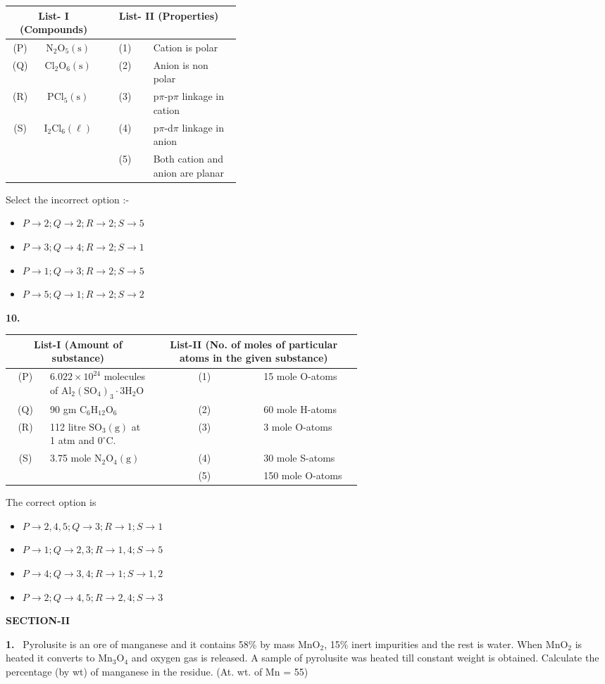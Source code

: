 \documentclass[10pt]{extarticle}
\newcommand{\sect}[1]{\par\smallskip\noindent\textbf{#1}\par}
\newcommand{\qn}[1]{\par\smallskip\noindent\textbf{#1.}~}
\newenvironment{qoptions}{\begin{itemize}[leftmargin=1.8em,itemsep=1pt,topsep=2pt,label={}]}{\end{itemize}}
\newcommand{\opt}[2]{\item[(#1)] #2}
\begin{document}
\begin{multicols}{2}
{\begin{tabular}{|c|c|c|p{0.38\linewidth}|}
\hline
\multicolumn{2}{|c|}{\textbf{List- I} (Compounds)} & \multicolumn{2}{c|}{\textbf{List- II} (Properties)}\\ \hline
(P) & $\mathrm{N_2O_5(s)}$ & (1) & Cation is polar\\ \hline
(Q) & $\mathrm{Cl_2O_6(s)}$ & (2) & Anion is non polar\\ \hline
(R) & $\mathrm{PCl_5(s)}$ & (3) & p$\pi$-p$\pi$ linkage in cation\\ \hline
(S) & $\mathrm{I_2Cl_6(\ell)}$ & (4) & p$\pi$-d$\pi$ linkage in anion\\ \hline
 & & (5) & Both cation and anion are planar\\ \hline
\end{tabular}}\par
Select the incorrect option :-
\begin{qoptions}
\opt{A}{$P\to2;Q\to2;R\to2;S\to5$}
\opt{B}{$P\to3;Q\to4;R\to2;S\to1$}
\opt{C}{$P\to1;Q\to3;R\to2;S\to5$}
\opt{D}{$P\to5;Q\to1;R\to2;S\to2$}
\end{qoptions}
\qn{10}
{\footnotesize\setlength{\tabcolsep}{2pt}\begin{tabular}{|c|p{0.3\linewidth}|c|p{0.28\linewidth}|}
\hline
\multicolumn{2}{|c|}{\textbf{List-I} (Amount of substance)} & \multicolumn{2}{p{0.42\linewidth}|}{\centering\textbf{List-II} (No. of moles of particular atoms in the given substance)}\\ \hline
(P) & $6.022\times10^{24}$ molecules of $\mathrm{Al_2(SO_4)_3{\cdot}3H_2O}$ & (1) & 15 mole O-atoms\\ \hline
(Q) & 90 gm $\mathrm{C_6H_{12}O_6}$ & (2) & 60 mole H-atoms\\ \hline
(R) & 112 litre $\mathrm{SO_3(g)}$ at 1 atm and $0^\circ$C. & (3) & 3 mole O-atoms\\ \hline
(S) & 3.75 mole $\mathrm{N_2O_4(g)}$ & (4) & 30 mole S-atoms\\ \hline
 & & (5) & 150 mole O-atoms\\ \hline
\end{tabular}}\par
The correct option is
\begin{qoptions}
\opt{A}{$P\to2,4,5;Q\to3;R\to1;S\to1$}
\opt{B}{$P\to1;Q\to2,3;R\to1,4;S\to5$}
\opt{C}{$P\to4;Q\to3,4;R\to1;S\to1,2$}
\opt{D}{$P\to2;Q\to4,5;R\to2,4;S\to3$}
\end{qoptions}
\sect{SECTION-II}
\qn{1} Pyrolusite is an ore of manganese and it contains 58\% by mass $\mathrm{MnO_2}$, 15\% inert impurities and the rest is water. When $\mathrm{MnO_2}$ is heated it converts to $\mathrm{Mn_3O_4}$ and oxygen gas is released. A sample of pyrolusite was heated till constant weight is obtained. Calculate the percentage (by wt) of manganese in the residue. (At. wt. of Mn = 55)

\end{multicols}
\end{document}
